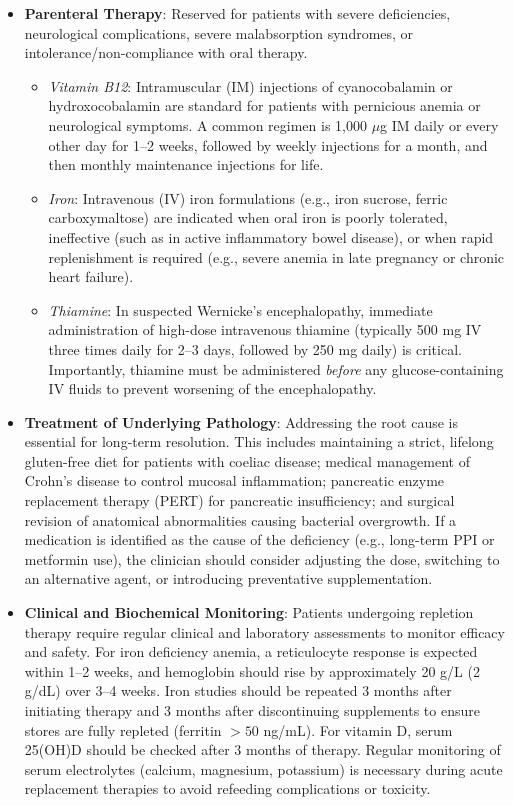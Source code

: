 \begin{itemize}
\begin{itemize}
  \end{itemize}
\item \textbf{Parenteral Therapy}: Reserved for patients with severe deficiencies, neurological complications, severe malabsorption syndromes, or intolerance/non-compliance with oral therapy.
  \begin{itemize}
  \item \textit{Vitamin B12}: Intramuscular (IM) injections of cyanocobalamin or hydroxocobalamin are standard for patients with pernicious anemia or neurological symptoms. A common regimen is 1,000 $\mu$g IM daily or every other day for 1--2 weeks, followed by weekly injections for a month, and then monthly maintenance injections for life.
  \item \textit{Iron}: Intravenous (IV) iron formulations (e.g., iron sucrose, ferric carboxymaltose) are indicated when oral iron is poorly tolerated, ineffective (such as in active inflammatory bowel disease), or when rapid replenishment is required (e.g., severe anemia in late pregnancy or chronic heart failure).
  \item \textit{Thiamine}: In suspected Wernicke's encephalopathy, immediate administration of high-dose intravenous thiamine (typically 500 mg IV three times daily for 2--3 days, followed by 250 mg daily) is critical. Importantly, thiamine must be administered \textit{before} any glucose-containing IV fluids to prevent worsening of the encephalopathy.
  \end{itemize}
\item \textbf{Treatment of Underlying Pathology}: Addressing the root cause is essential for long-term resolution. This includes maintaining a strict, lifelong gluten-free diet for patients with coeliac disease; medical management of Crohn's disease to control mucosal inflammation; pancreatic enzyme replacement therapy (PERT) for pancreatic insufficiency; and surgical revision of anatomical abnormalities causing bacterial overgrowth. If a medication is identified as the cause of the deficiency (e.g., long-term PPI or metformin use), the clinician should consider adjusting the dose, switching to an alternative agent, or introducing preventative supplementation.
\item \textbf{Clinical and Biochemical Monitoring}: Patients undergoing repletion therapy require regular clinical and laboratory assessments to monitor efficacy and safety. For iron deficiency anemia, a reticulocyte response is expected within 1--2 weeks, and hemoglobin should rise by approximately 20 g/L (2 g/dL) over 3--4 weeks. Iron studies should be repeated 3 months after initiating therapy and 3 months after discontinuing supplements to ensure stores are fully repleted (ferritin $> 50$ ng/mL). For vitamin D, serum 25(OH)D should be checked after 3 months of therapy. Regular monitoring of serum electrolytes (calcium, magnesium, potassium) is necessary during acute replacement therapies to avoid refeeding complications or toxicity.
\end{itemize}

